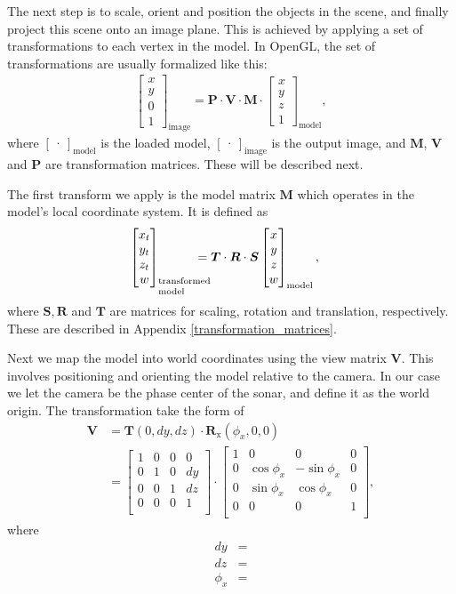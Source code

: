 \documentclass[12pt,journal,draftclsnofoot,onecolumn]{IEEEtran}
\newcommand\bmat[1]{\begin{bmatrix}#1\end{bmatrix}}
\renewcommand\vec[1]{\boldsymbol{#1}}
\newcommand\mat[1]{\boldsymbol{#1}}
\newcommand\1{\vec 1}
\newcommand*\y{\vec y}
\renewcommand*\P{\mat P}
\newcommand*\R{\mat R}
\renewcommand*\P{\mat P}
\newcommand*\V{\mat V}
\newcommand*\M{\mat M}
\begin{document}
The next step is to scale, orient and position the objects in the scene, and finally project this scene onto an image plane. This is achieved by applying a set of transformations to each vertex in the model. In OpenGL, the set of transformations are usually formalized like this:
\begin{align*}
\bmat{x\\y\\0\\1}_\text{image} = \P \cdot \V \cdot \M \cdot \bmat{x\\y\\z\\1}_\text{model},
\end{align*}
where $\bmat{\cdot}_\text{model}$ is the loaded model, $\bmat{\cdot}_\text{image}$ is the output image, and $\M$, $\V$ and $\P$ are transformation matrices. These will be described next.

The first transform we apply is the model matrix $\M$ which operates in the model's local coordinate system. It is defined as
\begin{align}
\bmat{x_t \\ y_t \\ z_t \\ w}_\text{\parbox{1cm}{\setlength\baselineskip{0.3cm}transformed\\model}} &= \boldsymbol{T} \cdot \R \cdot \boldsymbol{S} \bmat{x \\ y \\ z \\ w}_\text{model},
\end{align}
where $\boldsymbol{S}, \R$ and $\boldsymbol{T}$ are matrices for scaling, rotation and translation, respectively. These are described in Appendix \ref{transformation_matrices}. 

Next we map the model into world coordinates using the view matrix $\V$. This involves positioning and orienting the model relative to the camera. In our case we let the camera be the phase center of the sonar, and define it as the world origin. The transformation take the form of
\begin{align}
\V &= \mat{T}(0, dy, dz) \cdot \R_\text{x}(\phi_x, 0, 0) \nonumber\\
&= 
\bmat{
1  &  0  &  0  &  0 \\
0  &  1  &  0  &  dy \\
0  &  0  &  1  &  dz \\
0  &  0  &  0  &  1 \\
} \cdot
\bmat{
1  &  0           &  0           &  0 \\
0  &  \cos\phi_x  &  -\sin\phi_x &  0 \\
0  &  \sin\phi_x  &  \cos\phi_x  &  0 \\
0  &  0           &  0           &  1 \\
},
\end{align}
where
\begin{align*}
dy &= \\
dz &= \\
\phi_x &=
\end{align*}
\end{document}
